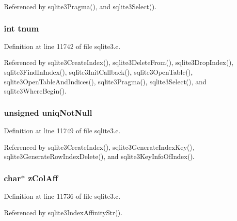Referenced by sqlite3\+Pragma(), and sqlite3\+Select().

\hypertarget{struct_index_a2943a2c9e4915d379274c39cbb0147d9}{}
\subsubsection[{tnum}]{\setlength{\rightskip}{0pt plus 5cm}int tnum}\label{struct_index_a2943a2c9e4915d379274c39cbb0147d9}


Definition at line 11742 of file sqlite3.\+c.



Referenced by sqlite3\+Create\+Index(), sqlite3\+Delete\+From(), sqlite3\+Drop\+Index(), sqlite3\+Find\+In\+Index(), sqlite3\+Init\+Callback(), sqlite3\+Open\+Table(), sqlite3\+Open\+Table\+And\+Indices(), sqlite3\+Pragma(), sqlite3\+Select(), and sqlite3\+Where\+Begin().

\hypertarget{struct_index_ab2797a34b09eb3e8a38eb169d86e2b5c}{}
\subsubsection[{uniq\+Not\+Null}]{\setlength{\rightskip}{0pt plus 5cm}unsigned uniq\+Not\+Null}\label{struct_index_ab2797a34b09eb3e8a38eb169d86e2b5c}


Definition at line 11749 of file sqlite3.\+c.



Referenced by sqlite3\+Create\+Index(), sqlite3\+Generate\+Index\+Key(), sqlite3\+Generate\+Row\+Index\+Delete(), and sqlite3\+Key\+Info\+Of\+Index().

\hypertarget{struct_index_a829718486911afcd2a61c54f28491d76}{}
\subsubsection[{z\+Col\+Aff}]{\setlength{\rightskip}{0pt plus 5cm}char$\ast$ z\+Col\+Aff}\label{struct_index_a829718486911afcd2a61c54f28491d76}


Definition at line 11736 of file sqlite3.\+c.



Referenced by sqlite3\+Index\+Affinity\+Str().

\hypertarget{struct_index_a661118d86ac4127d40bf3be78d92117d}{}

